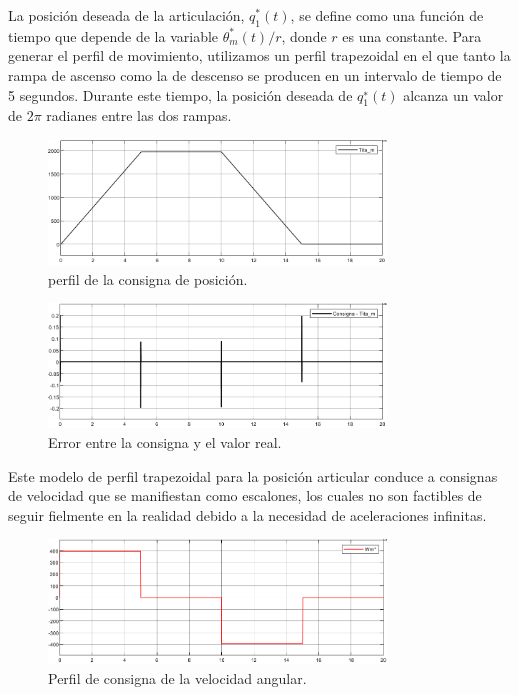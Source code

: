 \documentclass{article}
\begin{document}
La posición deseada de la articulación, $q^*_1(t)$, se define como una función de tiempo que depende 
de la variable $\theta^*_m(t)/r$, donde $r$ es una constante. Para generar el perfil de movimiento, 
utilizamos un perfil trapezoidal en el que tanto la rampa de ascenso como la de descenso se producen 
en un intervalo de tiempo de 5 segundos. Durante este tiempo, la posición deseada de $q^∗_1(t)$ alcanza 
un valor de $2\pi$ radianes entre las dos rampas.

\begin{figure}[H]
    \centering
    \includegraphics[width=0.8\textwidth]{5.2.4.a.1.png}
    \caption{perfil de la consigna de posición.}
\end{figure}

\begin{figure}[H]
    \centering
    \includegraphics[width=0.8\textwidth]{5.2.4.a.2.png}
    \caption{Error entre la consigna y el valor real.}
\end{figure}

Este modelo de perfil trapezoidal para la posición articular conduce a consignas de velocidad 
que se manifiestan como escalones, los cuales no son factibles de seguir fielmente en la realidad 
debido a la necesidad de aceleraciones infinitas.

\begin{figure}[H]
    \centering
    \includegraphics[width=0.8\textwidth]{5.2.4.a.3.png}
    \caption{Perfil de consigna de la velocidad angular.}
\end{figure}
\end{document}
